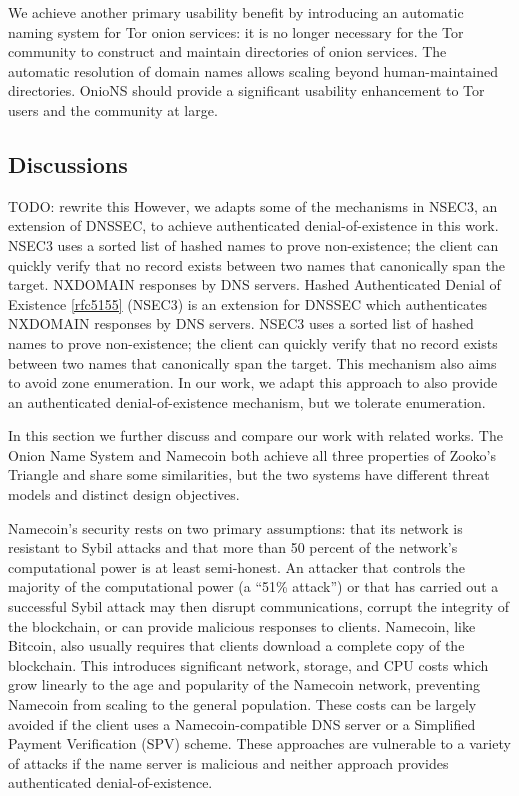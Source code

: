 \documentclass[USenglish,oneside,twocolumn]{article}
\begin{document}
We achieve another primary usability benefit by introducing an automatic naming system for Tor onion services: it is no longer necessary for the Tor community to construct and maintain directories of onion services. The automatic resolution of domain names allows scaling beyond human-maintained directories. OnioNS should provide a significant usability enhancement to Tor users and the community at large.

\subsection{Discussions}

TODO: rewrite this
However, we adapts some of the mechanisms in NSEC3, an extension of DNSSEC, to achieve authenticated denial-of-existence in this work. NSEC3 uses a sorted list of hashed names to prove non-existence; the client can quickly verify that no record exists between two names that canonically span the target. NXDOMAIN responses by DNS servers. Hashed Authenticated Denial of Existence \ref{rfc5155} (NSEC3) is an extension for DNSSEC which authenticates NXDOMAIN responses by DNS servers. NSEC3 uses a sorted list of hashed names to prove non-existence; the client can quickly verify that no record exists between two names that canonically span the target. This mechanism also aims to avoid zone enumeration. In our work, we adapt this approach to also provide an authenticated denial-of-existence mechanism, but we tolerate enumeration. 

In this section we further discuss and compare our work with related works. The Onion Name System and Namecoin both achieve all three properties of Zooko's Triangle and share some similarities, but the two systems have different threat models and distinct design objectives.

Namecoin's security rests on two primary assumptions: that its network is resistant to Sybil attacks and that more than 50 percent of the network's computational power is at least semi-honest. An attacker that controls the majority of the computational power (a ``51\% attack'') or that has carried out a successful Sybil attack may then disrupt communications, corrupt the integrity of the blockchain, or can provide malicious responses to clients. Namecoin, like Bitcoin, also usually requires that clients download a complete copy of the blockchain. This introduces significant network, storage, and CPU costs which grow linearly to the age and popularity of the Namecoin network, preventing Namecoin from scaling to the general population. These costs can be largely avoided if the client uses a Namecoin-compatible DNS server or a Simplified Payment Verification \cite{nakamoto2008bitcoin} (SPV) scheme. These approaches are vulnerable to a variety of attacks if the name server is malicious and neither approach provides authenticated denial-of-existence.
\end{document}
